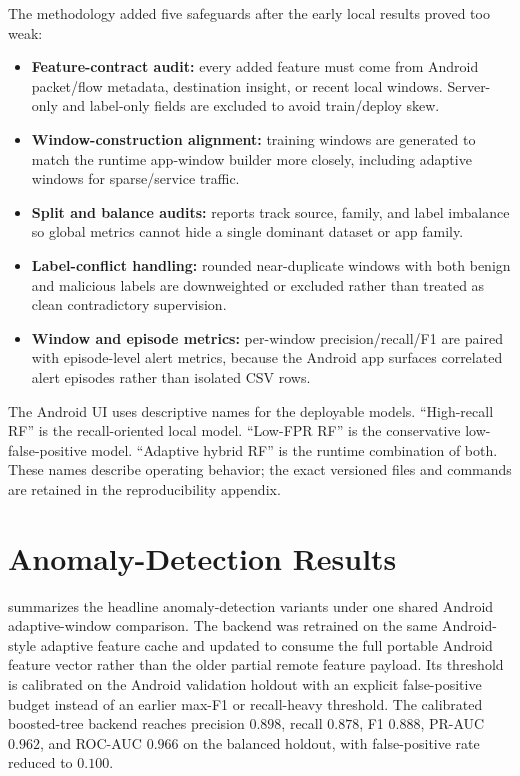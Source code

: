 The methodology added five safeguards after the early local results proved too weak:
\begin{itemize}[leftmargin=*]
  \item \textbf{Feature-contract audit:} every added feature must come from Android packet/flow
  metadata, destination insight, or recent local windows. Server-only and label-only fields are
  excluded to avoid train/deploy skew.
  \item \textbf{Window-construction alignment:} training windows are generated to match the runtime
  app-window builder more closely, including adaptive windows for sparse/service traffic.
  \item \textbf{Split and balance audits:} reports track source, family, and label imbalance so
  global metrics cannot hide a single dominant dataset or app family.
  \item \textbf{Label-conflict handling:} rounded near-duplicate windows with both benign and
  malicious labels are downweighted or excluded rather than treated as clean contradictory
  supervision.
  \item \textbf{Window and episode metrics:} per-window precision/recall/F1 are paired with
  episode-level alert metrics, because the Android app surfaces correlated alert episodes rather
  than isolated CSV rows.
\end{itemize}

The Android UI uses descriptive names for the deployable models. ``High-recall RF'' is the
recall-oriented local model. ``Low-FPR RF'' is the conservative low-false-positive model. ``Adaptive
hybrid RF'' is the runtime combination of both. These names describe operating behavior; the exact
versioned files and commands are retained in the reproducibility appendix.

\section{Anomaly-Detection Results}
 summarizes the headline anomaly-detection variants under one shared Android
adaptive-window comparison. The backend was retrained on the same Android-style adaptive feature
cache and updated to consume the full portable Android feature vector rather than the older partial
remote feature payload. Its threshold is calibrated on the Android validation holdout with an
explicit false-positive budget instead of an earlier max-F1 or recall-heavy threshold. The
calibrated boosted-tree backend reaches precision \(0.898\), recall \(0.878\), F1 \(0.888\),
PR-AUC \(0.962\), and ROC-AUC \(0.966\) on the balanced holdout, with false-positive rate reduced
to \(0.100\).

